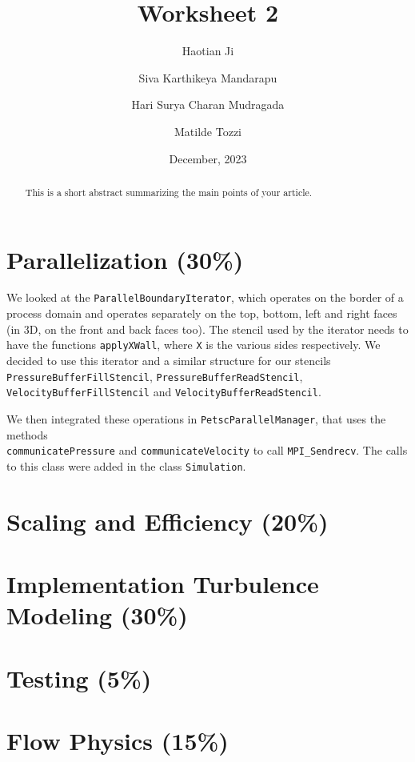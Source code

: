 \documentclass[
  english,        %
  font=palatino,     %
  onecolumn,      %
]{tumarticle}
\title{Worksheet 2}
\author{Haotian Ji}
\author{Siva Karthikeya Mandarapu}
\author{Hari Surya Charan Mudragada}
\author{Matilde Tozzi}
\date{December, 2023}
\begin{document}
\maketitle

\begin{abstract}
  This is a short abstract summarizing the main points of your article.
\end{abstract}

\section{Parallelization (30\%)}


We looked at the \texttt{ParallelBoundaryIterator}, which operates on the border of a process domain and operates separately on the top, bottom, left and right faces (in 3D, on the front and back faces too). The stencil used by the iterator needs to have the functions \texttt{applyXWall}, where \texttt{X} is the various sides respectively. We decided to use this iterator and a similar structure for our stencils \texttt{PressureBufferFillStencil}, \texttt{PressureBufferReadStencil}, \texttt{VelocityBufferFillStencil} and \texttt{VelocityBufferReadStencil}.

We then integrated these operations in \texttt{PetscParallelManager}, that uses the methods \\\texttt{communicatePressure} and \texttt{communicateVelocity} to call \texttt{MPI\_Sendrecv}. The calls to this class were added in the class \texttt{Simulation}.

\section{Scaling and Efficiency (20\%)}

\section{Implementation Turbulence Modeling (30\%)}

\section{Testing (5\%)}

\section{Flow Physics (15\%)}
\end{document}
